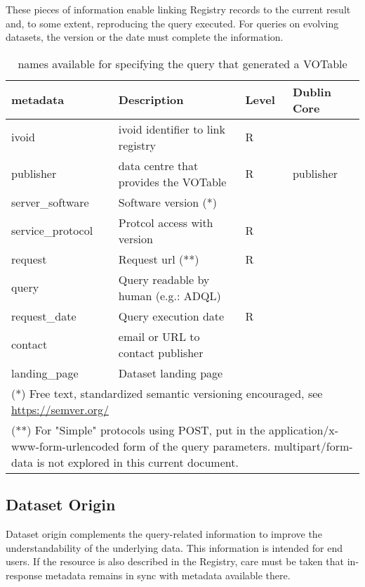 \documentclass[11pt,a4paper]{ivoa}
\begin{document}
These pieces of information enable linking Registry records to the
current result and, to some extent, reproducing the query executed. For
queries on evolving datasets, the version or the date must complete the
information.

\begin{table}
\begin{tabular}{|l|l|l|l|}  \hline
\textbf{metadata} & \textbf{Description} & \textbf{Level} & \textbf{Dublin Core}\\ \hline
ivoid             & ivoid identifier to link registry & R &  \\ \hline
publisher         & data centre that provides the VOTable & R & publisher\\ \hline
server\_software  & Software version (*) & & \\ \hline
service\_protocol & Protcol access with version & R& \\ \hline
request           & Request url (**)&  R& \\ \hline
query             & Query readable by human (e.g.: ADQL) &  & \\ \hline
request\_date     & Query execution date & R&\\ \hline	
contact           & email or URL to contact publisher & & \\ \hline	
landing\_page     & Dataset landing page & & \\ \hline
\multicolumn{4}{l}{\footnotesize(*) Free text, standardized semantic versioning encouraged, see \url{https://semver.org/}} \\
\multicolumn{4}{p{\textwidth}}{\footnotesize(**) For "Simple" protocols using POST, put in the application/x-www-form-urlencoded form of the query parameters. multipart/form-data is not explored in this current document.}
\end{tabular}
\caption{ names available for specifying the query that
generated a VOTable}
\label{tab:query-names}
\end{table}




\subsection{Dataset Origin}
Dataset origin complements the query-related information to improve the
understandability of the underlying data. This information is intended
for end users.  If the resource is also described in the Registry, care
must be taken that in-response metadata remains in sync with metadata
available there.
\end{document}
